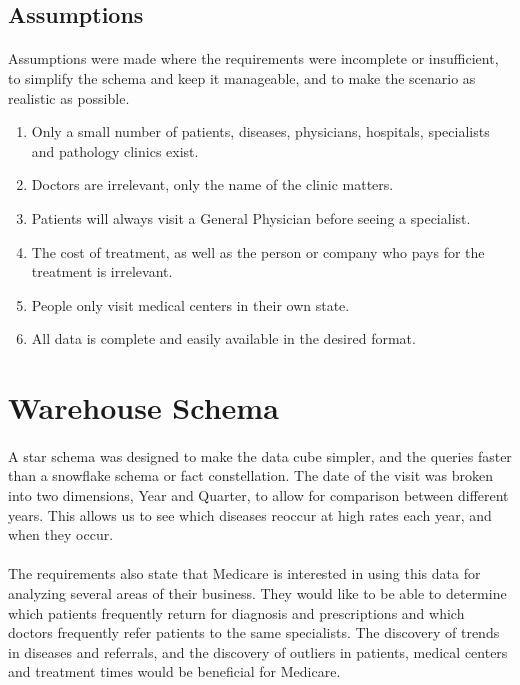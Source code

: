 \documentclass[a4paper,12pt,openbib]{article}
\begin{document}
\subsection*{Assumptions}
\paragraph{}
Assumptions were made where the requirements were incomplete or insufficient, to simplify the schema and keep it manageable, and to make the scenario as realistic as possible.
\begin{enumerate}
	\item Only a small number of patients, diseases, physicians, hospitals, specialists and pathology clinics exist.
	\item Doctors are irrelevant, only the name of the clinic matters.
	\item Patients will always visit a General Physician before seeing a specialist.
	\item The cost of treatment, as well as the person or company who pays for the treatment is irrelevant.
	\item People only visit medical centers in their own state.
	\item All data is complete and easily available in the desired format.
\end{enumerate}

\section*{Warehouse Schema}
\paragraph{}
A star schema was designed to make the data cube simpler, and the queries faster than a snowflake schema or fact constellation.
The date of the visit was broken into two dimensions, Year and Quarter, to allow for comparison between different years.
This allows us to see which diseases reoccur at high rates each year, and when they occur.
\paragraph{}
The requirements also state that Medicare is interested in using this data for analyzing several areas of their business.
They would like to be able to determine which patients frequently return for diagnosis and prescriptions and which doctors frequently refer patients to the same specialists.
The discovery of trends in diseases and referrals, and the discovery of outliers in patients, medical centers and treatment times would be beneficial for Medicare.
\end{document}
